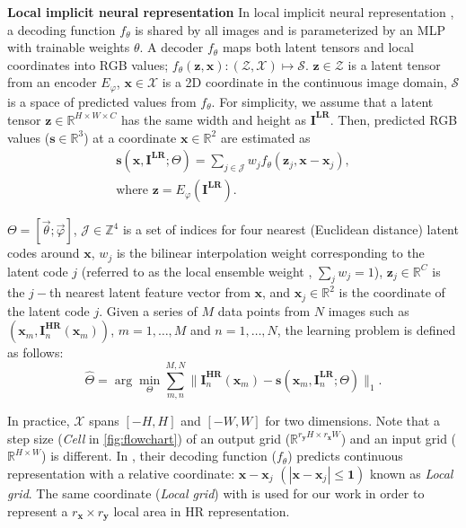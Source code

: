 \documentclass[10pt,twocolumn,letterpaper]{article}
\begin{document}
{\bf Local implicit neural representation} In local implicit neural representation \cite{Local_Implicit_Grid_CVPR20, chen2021learning}, a decoding function $f_\theta$ is shared by all images and is parameterized by an MLP with trainable weights $\theta$. A decoder $f_\theta$ maps both latent tensors and local coordinates into RGB values; $f_\theta(\mathbf z,\mathbf x): (\mathcal Z,\mathcal X) \mapsto \mathcal S$. $\mathbf z\in \mathcal Z$ is a latent tensor from an encoder $E_\varphi$, $\mathbf x\in \mathcal X$ is a 2D coordinate in the continuous image domain,  $\mathcal S$ is a space of predicted values from $f_\theta$. For simplicity, we assume that a latent tensor $\mathbf z\in \mathbb{R}^{H\times W\times C}$ has the same width and height as $\mathbf{I^{LR}}$. Then, predicted RGB values ($\mathbf s\in\mathbb{R}^{3}$) at a coordinate $\mathbf{x}\in\mathbb{R}^{2}$ are estimated as
\begin{gather}
    \mathbf s(\mathbf{x},\mathbf{I^{LR}};\Theta)=\sum_{j\in\mathcal{J}}w_j f_\theta(\mathbf{z}_j, \mathbf{x}-\mathbf{x}_j),\label{eq:one}\\
    \mbox{where }\mathbf{z}=  E_\varphi(\mathbf{I^{LR}})\label{eq:two}.
\end{gather}

$\Theta=[\vec \theta;\vec \varphi]$, $\mathcal{J}\in\mathbb{Z}^4$ is a set of indices for four nearest (Euclidean distance) latent codes around $\mathbf{x}$, $w_j$ is the bilinear interpolation weight corresponding to the latent code $j$ (referred to as the local ensemble weight \cite{chen2021learning}, $\sum_j w_j =1$), $\mathbf{z}_j\in \mathbb{R}^{C}$ is the $j-$th nearest latent feature vector from $\mathbf x$, and $\mathbf{x}_j\in \mathbb{R}^{2}$ is the coordinate of the latent code $j$. Given a series of $M$ data points from $N$ images such as $(\mathbf{x}_m,\mathbf I^{\mathbf{ HR}}_n(\mathbf x_m))$, $m=1,\dots,M$ and $n=1,\dots,N$, the learning problem is defined as follows:
\begin{equation}
    \hat{\Theta}=\arg\min_{\Theta} \sum_{m,n}^{M,N}\|\mathbf{I}^{\mathbf{ HR}}_n(\mathbf{x}_m)-\mathbf s(\mathbf{x}_m,\mathbf I^{\mathbf{ LR}}_n;\Theta)\|_1.\label{eq:three}
\end{equation}


In practice, $\mathcal X$ spans $[-H,H]$ and $[-W,W]$ for two dimensions. Note that a step size (\textit{Cell} in \cref{fig:flowchart}) of an output grid ($\mathbb{R}^{r_{\mathbf y}H\times r_{\mathbf x}W}$) and an input grid ($\mathbb{R}^{H\times W}$) is different. In \cite{Local_Implicit_Grid_CVPR20, chen2021learning}, their decoding function ($f_\theta$) predicts continuous representation with a relative coordinate: $\mathbf x -\mathbf x_j$ $(|\mathbf x -\mathbf x_j|\leq\mathbf 1)$ known as \textit{Local grid}. The same coordinate (\textit{Local grid}) with \cite{chen2021learning,Local_Implicit_Grid_CVPR20} is used for our work in order to represent
 a $r_{\mathbf x}\times r_{\mathbf y}$ local area in HR representation.
\end{document}
